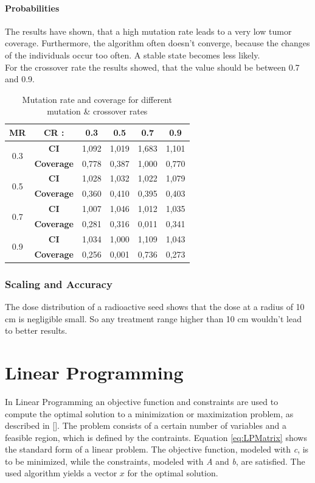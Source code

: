 \documentclass[12pt]{article}
\begin{document}
\newpage
\paragraph{Probabilities} 
The results have shown, that a high mutation rate leads to a very low tumor coverage. Furthermore, the algorithm often doesn't converge, because the changes of the individuals occur too often. A stable state becomes less likely. \\ For the crossover rate the results showed, that the value should be between 0.7 and 0.9.
\begin{table}[h]
\label{table:probabilities}
\begin{tabular}{c|ccccc}
\textbf{MR}          & \textbf{CR :}     & 0.3   & 0.5   & 0.7   & 0.9   \\ \hline
\multirow{2}{*}{0.3} & \textbf{CI}       & 1,092 & 1,019 & 1,683 & 1,101 \\
                     & \textbf{Coverage} & 0,778 & 0,387 & 1,000 & 0,770 \\ \hline
\multirow{2}{*}{0.5} & \textbf{CI}       & 1,028 & 1,032 & 1,022 & 1,079 \\
                     & \textbf{Coverage} & 0,360 & 0,410 & 0,395 & 0,403 \\ \hline
\multirow{2}{*}{0.7} & \textbf{CI}       & 1,007 & 1,046 & 1,012 & 1,035 \\
                     & \textbf{Coverage} & 0,281 & 0,316 & 0,011 & 0,341 \\ \hline
\multirow{2}{*}{0.9} & \textbf{CI}       & 1,034 & 1,000 & 1,109 & 1,043 \\
                     & \textbf{Coverage} & 0,256 & 0,001 & 0,736 & 0,273 \\
\end{tabular}
\caption{Mutation rate and coverage for different mutation \& crossover rates}

\end{table}
\subsubsection{Scaling and Accuracy}
The dose distribution of a radioactive seed shows that the dose at a radius of 10 cm is negligible small. So any treatment range higher than 10 cm wouldn't lead to better results. 


\section{Linear Programming}
In Linear Programming an objective function and constraints are used to compute the optimal solution to a minimization or maximization problem, as described in [\cite{matprog}]. The problem consists of a certain number of variables and a feasible region, which is defined by the contraints. 
Equation \eqref{eq:LPMatrix} shows the standard form of a linear problem. The objective function, modeled with \textit{c},  is to be minimized, while the constraints, modeled with \textit{A} and \textit{b}, are satisfied. The used algorithm yields a vector $x$ for the optimal solution.
\end{document}
